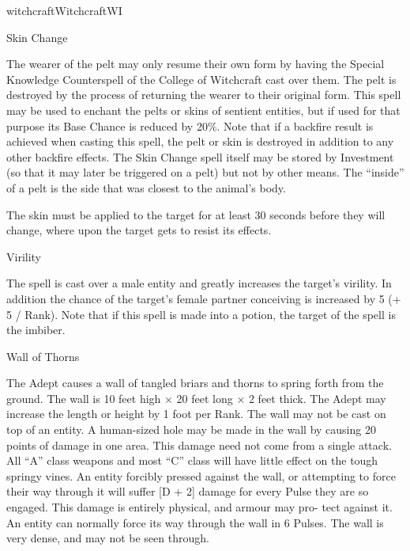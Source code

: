 \begin{College}[1.1]{witchcraft}{Witchcraft}{WI}
\begin{spell}[S-17]{Skin Change}
\begin{effects}
The wearer of the pelt may only resume their own form by having the
Special Knowledge Counterspell of the College of Witchcraft cast over
them.  The pelt is destroyed by the process of returning the wearer to
their original form. This spell may be used to enchant the pelts or
skins of sentient entities, but if used for that purpose its Base
Chance is reduced by 20\%.  Note that if a backfire result is achieved
when casting this spell, the pelt or skin is destroyed in addition to
any other backfire effects.  The Skin Change spell itself may be
stored by Investment (so that it may later be triggered on a pelt) but
not by other means. The “inside” of a pelt is the side that was
closest to the animal’s body.

The skin must be applied to the target for at least 30 seconds before
they will change, where upon the target gets to resist its effects.
\end{effects}
\end{spell}

\begin{spell}[S-18]{Virility}

\begin{effects}
The spell is cast over a male entity and greatly increases the
target’s virility.  In addition the chance of the target’s female
partner conceiving is increased by 5 (+ 5 / Rank). Note that if this
spell is made into a potion, the target of the spell is the imbiber.
\end{effects}
\end{spell}

\begin{spell}[S-19]{Wall of Thorns}

\begin{effects}
The Adept causes a wall of tangled briars and thorns to spring forth
from the ground.  The wall is 10 feet high × 20 feet long × 2 feet
thick.  The Adept may increase the length or height by 1 foot per
Rank. The wall may not be cast on top of an entity. A human-sized hole
may be made in the wall by causing 20 points of damage in one area.
This damage need not come from a single attack.  All “A” class weapons
and most “C” class will have little effect on the tough springy vines.
An entity forcibly pressed against the wall, or attempting to force
their way through it will suffer [D + 2] damage for every Pulse they
are so engaged.  This damage is entirely physical, and armour may pro-
tect against it. An entity can normally force its way through the wall
in 6 Pulses.  The wall is very dense, and may not be seen through.
\end{effects}
\end{spell}



\end{College}
